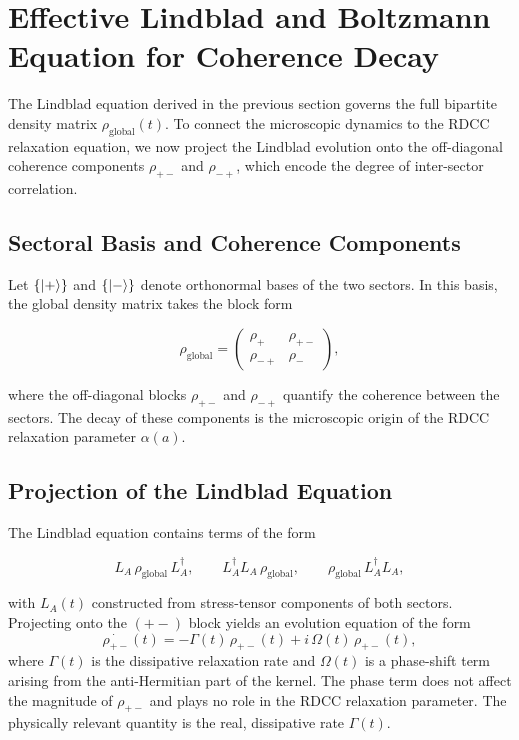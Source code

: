 \documentclass[11pt,a4paper]{article}
\newcommand{\rglobal}{\rho_{\mathrm{global}}}
\newcommand{\rplus}{\rho_+}
\newcommand{\rminus}{\rho_-}
\newcommand{\rpm}{\rho_{+-}}
\newcommand{\rmp}{\rho_{-+}}
\begin{document}
\section{Effective Lindblad and Boltzmann Equation for Coherence Decay}

The Lindblad equation derived in the previous section governs the full bipartite
density matrix \(\rglobal(t)\). To connect the microscopic dynamics to the
RDCC relaxation equation, we now project the Lindblad evolution onto the
off-diagonal coherence components \(\rpm\) and \(\rmp\), which encode the degree
of inter-sector correlation.

\subsection{Sectoral Basis and Coherence Components}

Let \(\{\ket{+}\}\) and \(\{\ket{-}\}\) denote orthonormal bases of the two sectors.
In this basis, the global density matrix takes the block form


\[
\rglobal =
\begin{pmatrix}
\rplus & \rpm \\
\rmp   & \rminus
\end{pmatrix},
\]


where the off-diagonal blocks \(\rpm\) and \(\rmp\) quantify the coherence between
the sectors. The decay of these components is the microscopic origin of the
RDCC relaxation parameter \(\alpha(a)\).

\subsection{Projection of the Lindblad Equation}

The Lindblad equation contains terms of the form


\[
L_{A}\,\rglobal\,L_{A}^{\dagger},
\qquad
L_{A}^{\dagger} L_{A}\,\rglobal,
\qquad
\rglobal\,L_{A}^{\dagger} L_{A},
\]


with \(L_{A}(t)\) constructed from stress-tensor components of both sectors.
Projecting onto the \((+-)\) block yields an evolution equation of the form
\begin{equation}
\dot{\rpm}(t)
    = -\Gamma(t)\, \rpm(t)
      + i\,\Omega(t)\, \rpm(t),
\end{equation}
where \(\Gamma(t)\) is the dissipative relaxation rate and \(\Omega(t)\) is a
phase-shift term arising from the anti-Hermitian part of the kernel. The phase
term does not affect the magnitude of \(\rpm\) and plays no role in the RDCC
relaxation parameter. The physically relevant quantity is the real, dissipative
rate \(\Gamma(t)\).
\end{document}
